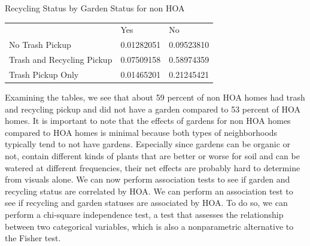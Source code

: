 \documentclass{article}
\begin{document}
\begin{center} Recycling Status by Garden Status for non HOA \end{center}
\begin{table}[H]
\begin{tabular}{lll}
                           & Yes        & No         \\
No Trash Pickup            & 0.01282051 & 0.09523810 \\
Trash and Recycling Pickup & 0.07509158 & 0.58974359 \\
Trash Pickup Only          & 0.01465201 & 0.21245421
\end{tabular}
\end{table}


Examining the tables, we see that about 59 percent of non HOA homes had trash and recycling pickup and did not have a garden compared to 53 percent of HOA homes. It is important to note that the effects of gardens for non HOA homes compared to HOA homes is minimal because both types of neighborhoods typically tend to not have gardens. Especially since gardens can be organic or not, contain different kinds of plants that are better or worse for soil and can be watered at different frequencies, their net effects are probably hard to determine from visuals alone. 
\newline
We can now perform association tests to see if garden and recycling status are correlated by HOA. 
\newline
We can perform an association test to see if recycling and garden statuses are associated by HOA. To do so, we can perform a chi-square independence test, a test that assesses the relationship between two categorical variables, which is also a nonparametric alternative to the Fisher test.
\end{document}
